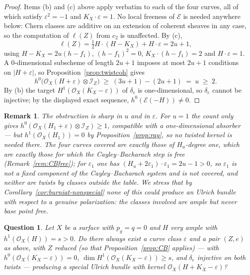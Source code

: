 \documentclass[10pt,a4paper]{amsart}
\newtheorem{remark}[theorem]{Remark}
\newtheorem{question}[theorem]{Question}
\newcommand{\OO}{\mathcal{O}}
\newcommand{\EE}{\mathcal{E}}
\newcommand{\II}{\mathcal{I}}
\newcommand{\len}{\ell}
\begin{document}
\begin{proof}
Items (b) and (c) above apply verbatim to each of the four curves, all of which satisfy $\varepsilon^2=-1$ and $K_X\cdot\varepsilon=1$. No local freeness of $\EE$ is needed anywhere below: Chern classes are additive on an extension of coherent sheaves in any case, so the computation of $\len(Z)$ from $c_2$ is unaffected. By (c),
\[
\len(Z)=\tfrac12H\cdot(H-K_X)+H\cdot\varepsilon=2u+1 ,
\]
using $H-K_X=2u(h-f_1)$, $(h-f_1)^2=0$, $K_X\cdot(h-f_1)=2$ and $H\cdot\varepsilon=1$. A $0$-dimensional subscheme of length $2u+1$ imposes at most $2u+1$ conditions on $|H+\varepsilon|$, so Proposition~\ref{prop:twistcoh} gives
\[
h^0\bigl(\OO_X(H+\varepsilon)\otimes\II_Z\bigr)\;\ge\;(3u+1)-(2u+1)\;=\;u\;\ge\;2 .
\]
By (b) the target $H^1(\OO_X(K_X-\varepsilon))$ of $\delta_e$ is one-dimensional, so $\delta_e$ cannot be injective; by the displayed exact sequence, $h^0(\EE(-H))\neq0$.
\end{proof}

\begin{remark}\label{rem:twistedfail-scope}
The obstruction is sharp in $u$ and in $\varepsilon$. For $u=1$ the count only gives $h^0(\OO_X(H_1+\varepsilon)\otimes\II_Z)\ge1$, compatible with a one-dimensional absorber --- but $h^1(\OO_X(H_1))=0$ by Proposition~\ref{prop:ray}, so no twisted kernel is needed there. The four curves covered are exactly those of $H_u$-degree one, which are exactly those for which the Cayley--Bacharach step is free (Remark~\ref{rem:CBfree}); for $\varepsilon_1$ one has $(H_u+2\varepsilon_1)\cdot\varepsilon_1=2u-1>0$, so $\varepsilon_1$ is not a fixed component of the Cayley--Bacharach system and is not covered, and neither are twists by classes outside the table. We stress that by Corollary~\ref{cor:burniat-nonspecial} none of this could produce an Ulrich bundle with respect to a genuine polarization: the classes involved are ample but never base point free.
\end{remark}

\begin{question}\label{q:twisted}
Let $X$ be a surface with $p_g=q=0$ and $H$ very ample with $h^1(\OO_X(H))=s>0$. Do there always exist a curve class $\varepsilon$ and a pair $(Z,e)$ as above, with $Z$ reduced (so that Proposition~\ref{prop:CB} applies) --- with $h^0(\OO_X(K_X-\varepsilon))=0$, $\dim H^1(\OO_X(K_X-\varepsilon))\ge s$, and $\delta_e$ injective on both twists --- producing a special Ulrich bundle with kernel $\OO_X(H+K_X-\varepsilon)$?
\end{question}
\end{document}
